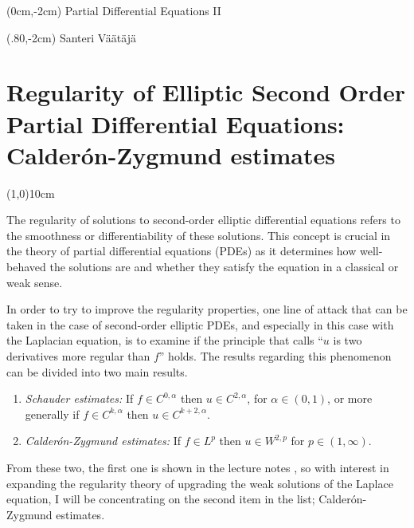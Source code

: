 \documentclass[12pt]{artikel1}
\begin{document}
\begin{textblock*}{250mm}(0cm,-2cm)
\noindent Partial Differential Equations \RN{2}
\end{textblock*}
\begin{textblock*}{250mm}(.80\textwidth,-2cm)
\noindent Santeri Väätäjä
\end{textblock*}
\vspace*{-2cm}
\section*{Regularity of Elliptic Second Order Partial Differential Equations: Calder\'{o}n-Zygmund estimates}
\vspace*{-.5cm}
\line(1,0){10cm}
\vspace*{.5cm}

\noindent The regularity of solutions to second-order elliptic differential equations refers to the smoothness or differentiability of these solutions. This concept is crucial in the theory of partial differential equations (PDEs) as it determines how well-behaved the solutions are and whether they satisfy the equation in a classical or weak sense.

In order to try to improve the regularity properties, one line of attack that can be taken in the case of second-order elliptic PDEs, and especially in this case with the Laplacian equation, is to examine if the principle that \cite{Fern_ndez_Real_2022} calls ``$u$ is two derivatives more regular than $f$'' holds. The results regarding this phenomenon can be divided into two main results.

\begin{enumerate}
    \item \textit{Schauder estimates:} If $f\in C^{0,\alpha}$ then $u\in C^{2,\alpha}$, for $\alpha\in(0,1)$, or more generally if $f\in C^{k,\alpha}$ then $u\in C^{k+2,\alpha}$.
    \item \textit{Calder\'{o}n-Zygmund estimates:} If $f\in L^p$ then $u\in W^{2,p}$ for $p\in(1,\infty)$.
\end{enumerate}

\noindent From these two, the first one is shown in the lecture notes \cite{covi}, so with interest in expanding the regularity theory of upgrading the weak solutions of the Laplace equation, I will be concentrating on the second item in the list; Calder\'{o}n-Zygmund estimates.
\end{document}
